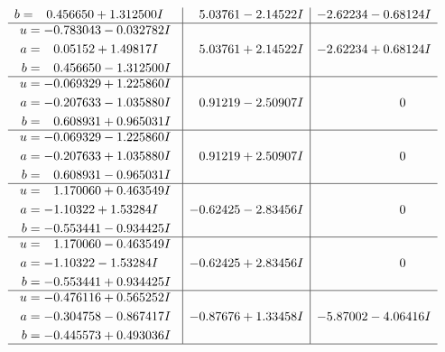 \documentclass[1p]{elsarticle_modified}
\theoremstyle{definition}
\begin{document}
$$\begin{array}{c|c|c}
\begin{aligned}
b &= \phantom{-}0.456650 + 1.312500 I\end{aligned}
 & \phantom{-}5.03761 - 2.14522 I & -2.62234 - 0.68124 I \\ \hline\begin{aligned}
u &= -0.783043 - 0.032782 I \\
a &= \phantom{-}0.05152 + 1.49817 I \\
b &= \phantom{-}0.456650 - 1.312500 I\end{aligned}
 & \phantom{-}5.03761 + 2.14522 I & -2.62234 + 0.68124 I \\ \hline\begin{aligned}
u &= -0.069329 + 1.225860 I \\
a &= -0.207633 - 1.035880 I \\
b &= \phantom{-}0.608931 + 0.965031 I\end{aligned}
 & \phantom{-}0.91219 - 2.50907 I & \phantom{-0.000000 } 0 \\ \hline\begin{aligned}
u &= -0.069329 - 1.225860 I \\
a &= -0.207633 + 1.035880 I \\
b &= \phantom{-}0.608931 - 0.965031 I\end{aligned}
 & \phantom{-}0.91219 + 2.50907 I & \phantom{-0.000000 } 0 \\ \hline\begin{aligned}
u &= \phantom{-}1.170060 + 0.463549 I \\
a &= -1.10322 + 1.53284 I \\
b &= -0.553441 - 0.934425 I\end{aligned}
 & -0.62425 - 2.83456 I & \phantom{-0.000000 } 0 \\ \hline\begin{aligned}
u &= \phantom{-}1.170060 - 0.463549 I \\
a &= -1.10322 - 1.53284 I \\
b &= -0.553441 + 0.934425 I\end{aligned}
 & -0.62425 + 2.83456 I & \phantom{-0.000000 } 0 \\ \hline\begin{aligned}
u &= -0.476116 + 0.565252 I \\
a &= -0.304758 - 0.867417 I \\
b &= -0.445573 + 0.493036 I\end{aligned}
 & -0.87676 + 1.33458 I & -5.87002 - 4.06416 I\\
 \hline 
 \end{array}$$\newpage$$\begin{array}{c|c|c}  

\end{array}$$
\end{document}

